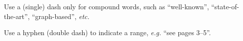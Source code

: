 Use a (single) dash only for compound words, such as ``well-known'', 
``state-of-the-art'', ``graph-based'', \emph{etc.}

Use a hyphen (double dash) to indicate a range, \emph{e.g.} ``see 
pages 3--5''.
